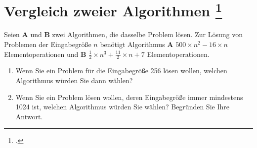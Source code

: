 \documentclass{lehramt-informatik-aufgabe}
\begin{document}

\section{Vergleich zweier Algorithmen
\footcite[Seite 1, Aufgabe 1: Komplexität]{aud:ab:7}
}

Seien \textbf{A} und \textbf{B} zwei Algorithmen, die dasselbe Problem
lösen. Zur Lösung von Problemen der Eingabegröße $n$ benötigt
Algorithmus \textbf{A} $500 \times n^2 - 16 \times n$ Elementoperationen
und \textbf{B} $\frac{1}{2} \times n^3 + \frac{11}{2} \times  n + 7$
Elementoperationen.

\begin{enumerate}


\item Wenn Sie ein Problem für die Eingabegröße 256 lösen wollen,
welchen Algorithmus würden Sie dann wählen?


\item Wenn Sie ein Problem lösen wollen, deren Eingabegröße immer
mindestens 1024 ist, welchen Algorithmus würden Sie wählen? Begründen
Sie Ihre Antwort.

\end{enumerate}
\end{document}
